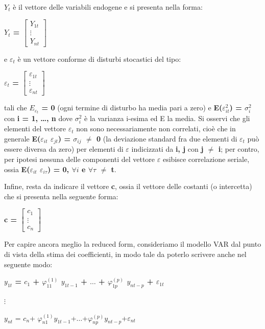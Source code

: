 \documentclass[12pt,a4paper,twoside,openright]{book}
\begin{document}
{\bfseries $Y_{t}$} è il vettore delle variabili endogene e si presenta nella forma:
\begin{center}
{\bfseries $Y_{t}$ = $\begin{bmatrix}
Y_{1t}\\ \vdots \\ Y_{nt} 
\end{bmatrix}$ }
\end{center}
e $\varepsilon_{t}$ è un vettore conforme di disturbi stocastici del tipo:
\begin{center}
{\bfseries $\varepsilon_{t}$ = $\begin{bmatrix}
\varepsilon_{1t}\\ \vdots \\ \varepsilon_{nt} 
\end{bmatrix}$ }
\end{center}
tali che {\bfseries $E_{\varepsilon_{t}}$ = 0} (ogni termine di disturbo ha media pari a zero) e {\bfseries E($\varepsilon^2_{it}$) = $\sigma^2_{i}$} con {\bfseries i = 1, \dots, n} dove {\bfseries $\sigma^2_{i}$} è la varianza i-esima ed E la media. Si osservi che gli elementi del vettore $\varepsilon_{t}$ non sono necessariamente non correlati, cioè che in generale {\bfseries E($\varepsilon_{it}$ $\varepsilon_{jt}$) = $\sigma_{ij}$ $\neq$ 0 } (la deviazione standard fra due elementi di $\varepsilon_{t}$ può essere diversa da zero) per elementi di $\varepsilon$ indicizzati da {\bfseries i, j}  con {\bfseries j $\neq$ i}; per contro, per ipotesi nessuna delle componenti del vettore $\varepsilon$ esibisce correlazione seriale, ossia {\bfseries E($\varepsilon_{it}$ $\varepsilon_{i \tau}$) = 0, $\forall{i}$ e $\forall{\tau}$ $\neq$ t}.

Infine, resta da indicare il vettore {\bfseries c}, ossia il vettore delle costanti (o intercetta) che si presenta nella seguente forma: 
\begin{center}
{\bfseries c = 
$\begin{bmatrix}
c_{1} \\ \vdots \\ c_{n}
\end{bmatrix}$  }
\end{center}

Per capire ancora meglio la reduced form, consideriamo il modello VAR dal punto di vista della stima dei coefficienti, in modo tale da poterlo scrivere anche nel seguente modo: 
\begin{center}
{\bfseries
$y_{1t}$ = $c_{1}$ + $\varphi^{(1)}_{11}$ $y_{1t-1}$ + $\dots$ + $\varphi^{(p)}_{1p}$ $y_{nt-p}$ + $\varepsilon_{1t}$ 

$\vdots$

$y_{nt}$ = $c_n$+ $\varphi_{n1}^{(1)}y_{1t-1}$+$\dots$+$\varphi_{np}^{(p)}y_{nt-p}$+$\varepsilon_{nt}$
}
\end{center}
\end{document}
